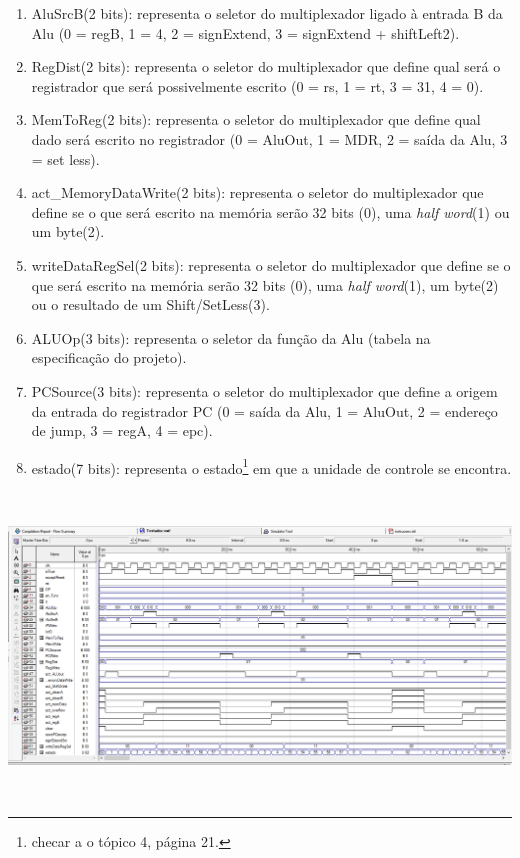 \documentclass{article}
\begin{document}
\begin{enumerate}
        \item AluSrcB(2 bits): representa o seletor do multiplexador ligado à entrada B da Alu (0 = regB, 1 = 4, 2 = signExtend, 3 = signExtend + shiftLeft2).
        \item RegDist(2 bits): representa o seletor do multiplexador que define qual será o registrador que será possivelmente escrito (0 = rs, 1 = rt, 3 = 31, 4 = 0).
        \item MemToReg(2 bits): representa o seletor do multiplexador que define qual dado será escrito no registrador (0 = AluOut, 1 = MDR, 2 = saída da Alu, 3 = set less).
        \item act\_MemoryDataWrite(2 bits): representa o seletor do multiplexador que define se o que será escrito na memória serão 32 bits (0), uma {\it half word}(1) ou um byte(2).
        \item writeDataRegSel(2 bits): representa o seletor do multiplexador que define se o que será escrito na memória serão 32 bits (0), uma {\it half word}(1), um byte(2) ou o resultado de um Shift/SetLess(3).
        \item ALUOp(3 bits): representa o seletor da função da Alu (tabela na especificação do projeto).
        \item PCSource(3 bits): representa o seletor do multiplexador que define a origem da entrada do registrador PC (0 = saída da Alu, 1 = AluOut, 2 = endereço de jump, 3 = regA, 4 = epc).
        \item estado(7 bits): representa o estado\footnote{checar a o tópico 4, página 21.} em que a unidade de controle se encontra.\\
    \end{enumerate}\\
    \begin{center}
        \includegraphics[scale=0.4]{ControlUnity.PNG}
    \end{center}
\\
    
\end{document}
